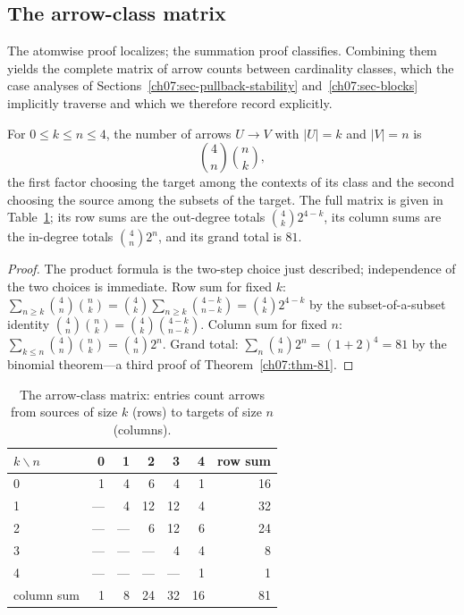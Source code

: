 \subsection{The arrow-class matrix}

The atomwise proof localizes; the summation proof classifies. Combining them yields the complete matrix of arrow counts between cardinality classes, which the case analyses of Sections~\ref{ch07:sec-pullback-stability} and~\ref{ch07:sec-blocks} implicitly traverse and which we therefore record explicitly.

\begin{proposition}\label{ch07:prop-matrix}
For $0\le k\le n\le 4$, the number of arrows $U\to V$ with $|U|=k$ and $|V|=n$ is
\[
\binom{4}{n}\binom{n}{k},
\]
the first factor choosing the target among the contexts of its class and the second choosing the source among the subsets of the target. The full matrix is given in Table~\ref{ch07:tab-matrix}; its row sums are the out-degree totals $\binom{4}{k}2^{4-k}$, its column sums are the in-degree totals $\binom{4}{n}2^{n}$, and its grand total is $81$.
\end{proposition}

\begin{proof}
The product formula is the two-step choice just described; independence of the two choices is immediate. Row sum for fixed $k$: $\sum_{n\ge k}\binom{4}{n}\binom{n}{k}=\binom{4}{k}\sum_{n\ge k}\binom{4-k}{n-k}=\binom{4}{k}2^{4-k}$ by the subset-of-a-subset identity $\binom{4}{n}\binom{n}{k}=\binom{4}{k}\binom{4-k}{n-k}$. Column sum for fixed $n$: $\sum_{k\le n}\binom{4}{n}\binom{n}{k}=\binom{4}{n}2^{n}$. Grand total: $\sum_{n}\binom{4}{n}2^{n}=(1+2)^{4}=81$ by the binomial theorem---a third proof of Theorem~\ref{ch07:thm-81}.
\end{proof}

\begin{table}[htbp]
\centering
\caption{The arrow-class matrix: entries count arrows from sources of size $k$ (rows) to targets of size $n$ (columns).}
\label{ch07:tab-matrix}
\begin{tabular}{@{}lrrrrrr@{}}
\toprule
$k\backslash n$ & 0 & 1 & 2 & 3 & 4 & row sum \\
\midrule
0 & 1 & 4 & 6 & 4 & 1 & 16 \\
1 & --- & 4 & 12 & 12 & 4 & 32 \\
2 & --- & --- & 6 & 12 & 6 & 24 \\
3 & --- & --- & --- & 4 & 4 & 8 \\
4 & --- & --- & --- & --- & 1 & 1 \\
\midrule
column sum & 1 & 8 & 24 & 32 & 16 & 81 \\
\bottomrule
\end{tabular}
\end{table}


